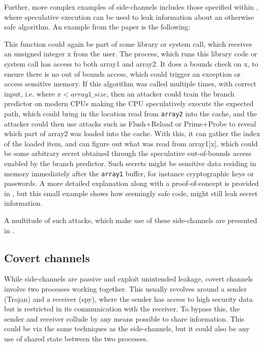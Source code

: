 Further, more complex examples of side-channels includes those specified within
\cite{kocher2019}, where speculative execution can be used to leak information
about an otherwise safe algorithm. An example from the paper is the following:

\begin{algorithm}[H]
  \algrenewcommand{}
  \begin{algorithmic}[1]
    \EndIf
  \end{algorithmic}
\end{algorithm}

This function could again be part of some library or system call, which
receives an unsigned integer x from the user. The process, which runs this
library code or system call has access to both array1 and array2. It does a
bounds check on x, to ensure there is no out of bounds access, which could
trigger an exception or access sensitive memory. If this algorithm was called
multiple times, with correct input, i.e. where $x < array1\_size$, then an
attacker could train the branch predictor on modern CPUs making the CPU
speculatively execute the expected path, which could bring in the location read
from \texttt{array2} into the cache, and the attacker could then use attacks
such as Flush+Reload or Prime+Probe to reveal which part of array2 was loaded
into the cache. With this, it can gather the index of the loaded item, and can
figure out what was read from array1[x], which could be some arbitrary secret
obtained through the speculative out-of-bounds access enabled by the branch
predictor. Such secrets might be sensitive data residing in memory immediately
after the \texttt{array1} buffer, for instance cryptographic keys or passwords.
A more detailed explanation along with a proof-of-concept is provided in
\cite{kocher2019}, but this small example shows how seemingly safe code, might
still leak secret information.

A multitude of such attacks, which make use of these side-channels are
presented in \cite{osvik2006, liu2015}.

\subsection{Covert channels}\label{sub:covert-channel}
While side-channels are passive and exploit unintended leakage, covert channels
involve two processes working together.  This usually revolves around a sender
(Trojan) and a receiver (spy), where the sender has access to high security
data but is restricted in its communication with the receiver. To bypass this,
the sender and receiver collude by any means possible to share information.
This could be via the same techniques as the side-channels, but it could also
be any use of shared state between the two processes.

